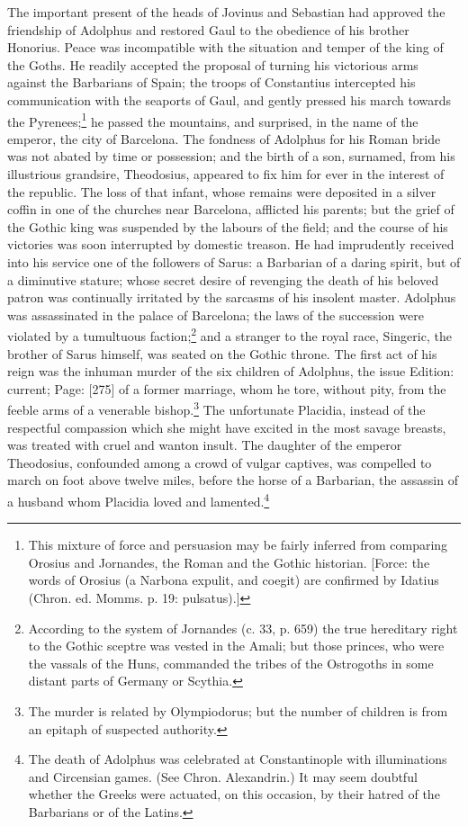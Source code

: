 The important present of the heads of Jovinus and Sebastian had approved the friendship of Adolphus and restored Gaul to the obedience of his brother Honorius. Peace was incompatible with the situation and temper of the king of the Goths. He readily accepted the proposal of turning his victorious arms against the Barbarians of Spain; the troops of Constantius intercepted his communication with the seaports of Gaul, and gently pressed his march towards the Pyrenees;\footnote{This mixture of force and persuasion may be fairly inferred from comparing Orosius and Jornandes, the Roman and the Gothic historian. [Force: the words of Orosius (a Narbona expulit, and coegit) are confirmed by Idatius (Chron. ed. Momms. p. 19: pulsatus).]} he passed the mountains, and surprised, in the name of the emperor, the city of Barcelona. The fondness of Adolphus for his Roman bride was not abated by time or possession; and the birth of a son, surnamed, from his illustrious grandsire, Theodosius, appeared to fix him for ever in the interest of the republic. The loss of that infant, whose remains were deposited in a silver coffin in one of the churches near Barcelona, afflicted his parents; but the grief of the Gothic king was suspended by the labours of the field; and the course of his victories was soon interrupted by domestic treason. He had imprudently received into his service one of the followers of Sarus: a Barbarian of a daring spirit, but of a diminutive stature; whose secret desire of revenging the death of his beloved patron was continually irritated by the sarcasms of his insolent master. Adolphus was assassinated in the palace of Barcelona; the laws of the succession were violated by a tumultuous faction;\footnote{According to the system of Jornandes (c. 33, p. 659) the true hereditary right to the Gothic sceptre was vested in the Amali; but those princes, who were the vassals of the Huns, commanded the tribes of the Ostrogoths in some distant parts of Germany or Scythia.} and a stranger to the royal race, Singeric, the brother of Sarus himself, was seated on the Gothic throne. The first act of his reign was the inhuman murder of the six children of Adolphus, the issue Edition: current; Page: [275] of a former marriage, whom he tore, without pity, from the feeble arms of a venerable bishop.\footnote{The murder is related by Olympiodorus; but the number of children is from an epitaph of suspected authority.} The unfortunate Placidia, instead of the respectful compassion which she might have excited in the most savage breasts, was treated with cruel and wanton insult. The daughter of the emperor Theodosius, confounded among a crowd of vulgar captives, was compelled to march on foot above twelve miles, before the horse of a Barbarian, the assassin of a husband whom Placidia loved and lamented.\footnote{The death of Adolphus was celebrated at Constantinople with illuminations and Circensian games. (See Chron. Alexandrin.) It may seem doubtful whether the Greeks were actuated, on this occasion, by their hatred of the Barbarians or of the Latins.}

